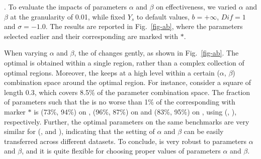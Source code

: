 .
To evaluate the impacts of parameters $\alpha$ and $\beta$ on effectiveness, we varied $\alpha$ and $\beta$ at the granularity of 0.01, while fixed $Y_s$ to default values, $b=+\infty$, $Dif=1$ and $\sigma=-1.0$. The results are reported in Fig.~\ref{fig-ab}, where the parameters selected earlier and their corresponding \PairAcc are marked with $*$.

When varying $\alpha$ and $\beta$, the \PairAcc of \ensemblerank changes gently, as shown in Fig.~\ref{fig-ab}.
The optimal \PairAcc is obtained within a single region, rather than a complex collection of optimal regions.
%
Moreover, the \PairAcc keeps at a high level within a certain ($\alpha$, $\beta$) combination space around the optimal region.
For instance, consider a square of length 0.3, which covers 8.5\% of the parameter combination space. The fraction of parameters such that the \PairAcc is no worse than 1\% of the corresponding \PairAcc with marker $*$ is (73\%, 94\%) on \aan, (96\%, 87\%) on \aminer and (83\%, 95\%) on \magdata, using (\recom, \fcita), respectively.
%
Further, the optimal parameters on the same benchmarks are very similar for (\aan, \aminer and \magdata), indicating that the setting of $\alpha$ and $\beta$ can be easily transferred across different datasets.
To conclude, \ensemblerank is very robust to parameters $\alpha$ and $\beta$, and it is quite flexible for choosing proper values of parameters $\alpha$ and $\beta$.


